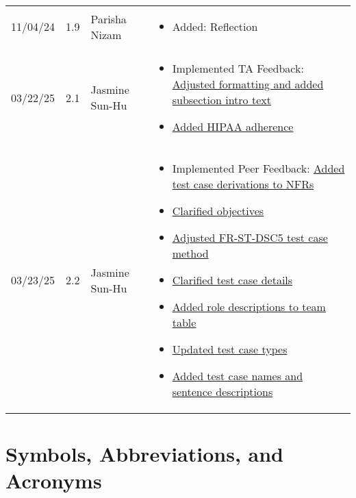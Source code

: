 \documentclass[12pt, titlepage]{article}
\begin{document}
\begin{longtable}{p{2cm}p{1cm}p{4cm}p{8cm}}
11/04/24 & 1.9 & Parisha Nizam &
\begin{itemize}[noitemsep, topsep=0pt]
  \item Added: Reflection
\end{itemize} \\

03/22/25 & 2.1 & Jasmine Sun-Hu &
\begin{itemize}[noitemsep, topsep=0pt]
  \item Implemented TA Feedback: \href{https://github.com/parishanizam/TeleHealth/issues/292}{Adjusted formatting and added subsection intro text}
  \item \href{https://github.com/parishanizam/TeleHealth/issues/293}{Added HIPAA adherence}
\end{itemize} \\

03/23/25 & 2.2 & Jasmine Sun-Hu &
\begin{itemize}[noitemsep, topsep=0pt]
  \item Implemented Peer Feedback: \href{https://github.com/parishanizam/TeleHealth/issues/224}{Added test case derivations to NFRs}
  \item \href{https://github.com/parishanizam/TeleHealth/issues/223}{Clarified objectives}
  \item \href{https://github.com/parishanizam/TeleHealth/issues/222}{Adjusted FR-ST-DSC5 test case method}
  \item \href{https://github.com/parishanizam/TeleHealth/issues/221}{Clarified test case details}
  \item \href{https://github.com/parishanizam/TeleHealth/issues/206}{Added role descriptions to team table}
  \item \href{https://github.com/parishanizam/TeleHealth/issues/205}{Updated test case types}
  \item \href{https://github.com/parishanizam/TeleHealth/issues/204}{Added test case names and sentence descriptions}
\end{itemize} \\

\bottomrule
\end{longtable}

\newpage

\tableofcontents

\listoftables

\newpage

\section{Symbols, Abbreviations, and Acronyms}
\end{document}

